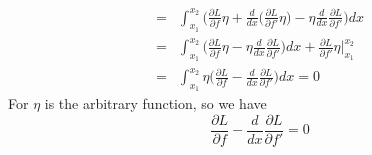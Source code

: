 \documentclass[12pt, a4paper]{article}
\begin{document}
\begin{itemize}
\begin{align*}
            =&\int_{x_1}^{x_2}\Big(\frac{\partial L}{\partial f}\eta+\frac{d}{dx}\Big(\frac{\partial L}
            {\partial f'}\eta\Big)-\eta\frac{d}{dx}\frac{\partial L}{\partial f'}\Big)dx\\
            =&\int_{x_1}^{x_2}\Big(\frac{\partial L}{\partial f}\eta-\eta\frac{d}{dx}\frac{\partial L}
            {\partial f'}\Big)dx+\frac{\partial L}{\partial f'}\eta\Big\vert_{x_1}^{x_2}\\
            =&\int_{x_1}^{x_2}\eta\Big(\frac{\partial L}{\partial f}-\frac{d}{dx}\frac{\partial L}
            {\partial f'}\Big)dx=0
        \end{align*}
        For $\eta$ is the arbitrary function, so we have
        \begin{equation}
            \frac{\partial L}{\partial f}-\frac{d}{dx}\frac{\partial L}{\partial f'}=0
        \end{equation}
    \end{itemize}
\end{document}
